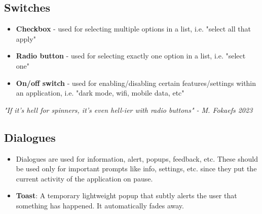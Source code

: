 \documentclass[12pt]{book}
\begin{document}
\subsection*{Switches}

\begin{itemize}
  \item \textbf{Checkbox} - used for selecting multiple options in a list, i.e. "select all that apply"
  \item \textbf{Radio button} - used for selecting exactly one option in a list, i.e. "select one"
  \item \textbf{On/off switch} - used for enabling/disabling certain features/settings within an application, i.e. "dark mode, wifi, mobile data, etc"
\end{itemize}

\textit{"If it's hell for spinners, it's even hell-ier with radio buttons" - M. Fokaefs 2023}

\subsection*{Dialogues}
\begin{itemize}
  \item Dialogues are used for information, alert, popups, feedback, etc. These should be used only for important prompts like info, settings, etc. since they put the current activity of the application on pause.
  \item \textbf{Toast}: A temporary lightweight popup that subtly alerts the user that something has happened. It automatically fades away.
\end{itemize}
\end{document}
